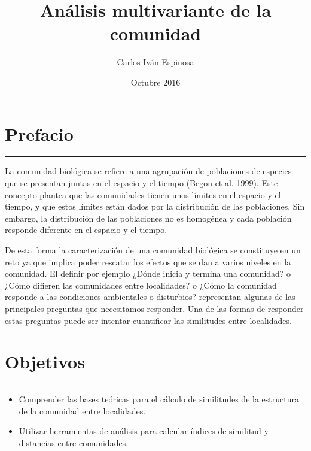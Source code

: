 \documentclass[]{book}
\title{Análisis multivariante de la comunidad}
\author{Carlos Iván Espinosa}
\date{Octubre 2016}
\begin{document}
\maketitle

{
\setcounter{tocdepth}{1}
\tableofcontents
}
\chapter*{Prefacio}\label{prefacio}

\begin{center}\rule{0.5\linewidth}{\linethickness}\end{center}

La comunidad biológica se refiere a una agrupación de poblaciones de
especies que se presentan juntas en el espacio y el tiempo (Begon et al.
1999). Este concepto plantea que las comunidades tienen unos límites en
el espacio y el tiempo, y que estos límites están dados por la
distribución de las poblaciones. Sin embargo, la distribución de las
poblaciones no es homogénea y cada población responde diferente en el
espacio y el tiempo.

De esta forma la caracterización de una comunidad biológica se
constituye en un reto ya que implica poder rescatar los efectos que se
dan a varios niveles en la comunidad. El definir por ejemplo ¿Dónde
inicia y termina una comunidad? o ¿Cómo difieren las comunidades entre
localidades? o ¿Cómo la comunidad responde a las condiciones ambientales
o disturbios? representan algunas de las principales preguntas que
necesitamos responder. Una de las formas de responder estas preguntas
puede ser intentar cuantificar las similitudes entre localidades.

\chapter*{Objetivos}\label{objetivos}

\begin{center}\rule{0.5\linewidth}{\linethickness}\end{center}

\begin{itemize}
\item
  Comprender las bases teóricas para el cálculo de similitudes de la
  estructura de la comunidad entre localidades.
\item
  Utilizar herramientas de análisis para calcular índices de similitud y
  distancias entre comunidades.
\end{itemize}
\end{document}
